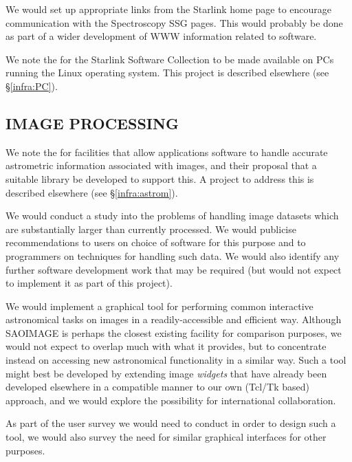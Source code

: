 {We would set up appropriate links from the Starlink home page to
encourage communication with the Spectroscopy SSG pages. This would
probably be done as part of a wider development of WWW information
related to software.}

{We note the  for the Starlink Software Collection to be
made available on PCs running the Linux operating system. This project
is described elsewhere (see \S\ref{infra:PC}).}


\subsection{IMAGE PROCESSING}

{We note the  for facilities that allow applications software
to handle accurate astrometric information associated with images, and
their proposal that a suitable library be developed to support this. A
project to address this is described elsewhere (see
\S\ref{infra:astrom}).}

{We would conduct a study into the problems of handling image datasets
which are substantially larger than currently processed. We would
publicise recommendations to users on choice of software for this
purpose and to programmers on techniques for handling such data. We
would also identify any further software development work that may be
required (but would not expect to implement it as part of this
project).}

{We would implement a graphical tool for performing common interactive
astronomical tasks on images in a readily-accessible and efficient
way. Although SAOIMAGE is perhaps the closest existing facility for
comparison purposes, we
would not expect to overlap much with what it provides, but to
concentrate instead on accessing new astronomical functionality in a
similar way. Such a tool might best be developed by extending image
{\em widgets} that have already been developed elsewhere in a
compatible manner to our own (Tcl/Tk based) approach, and we would
explore the possibility for international collaboration.

As part of the user survey we would need to conduct in order to design
such a tool, we would also survey the need for similar graphical
interfaces for other purposes.}

